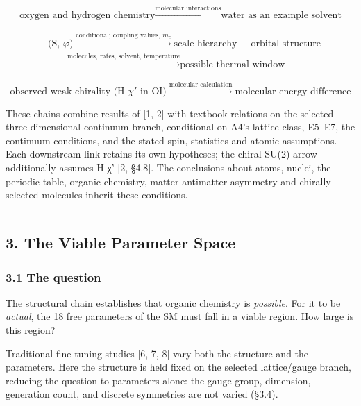 \documentclass[
]{article}
\begin{document}
\[\text{oxygen and hydrogen chemistry} \xrightarrow{\text{molecular interactions}} \text{water as an example solvent}\]

\[\begin{aligned}
&\text{(S, } \varphi\text{)} \xrightarrow{\text{conditional; coupling values, } m_e} \text{scale hierarchy + orbital structure}\\
&\qquad \xrightarrow{\text{molecules, rates, solvent, temperature}} \text{possible thermal window}
\end{aligned}\]

\[\text{observed weak chirality (H-}\chi'\text{ in OI)} \xrightarrow{\text{molecular calculation}} \text{molecular energy difference}\]

These chains combine results of {[}1, 2{]} with textbook relations on
the selected three-dimensional continuum branch, conditional on A4's
lattice class, E5--E7, the continuum conditions, and the stated spin,
statistics and atomic assumptions. Each downstream link retains its own
hypotheses; the chiral-SU(2) arrow additionally assumes H-χ' {[}2,
§4.8{]}. The conclusions about atoms, nuclei, the periodic table,
organic chemistry, matter-antimatter asymmetry and chirally selected
molecules inherit these conditions.

\begin{center}\rule{0.5\linewidth}{0.5pt}\end{center}

\hypertarget{the-viable-parameter-space}{%
\subsection{3. The Viable Parameter
Space}\label{the-viable-parameter-space}}

\hypertarget{the-question}{%
\subsubsection{3.1 The question}\label{the-question}}

The structural chain establishes that organic chemistry is
\emph{possible}. For it to be \emph{actual}, the 18 free parameters of
the SM must fall in a viable region. How large is this region?

Traditional fine-tuning studies {[}6, 7, 8{]} vary both the structure
and the parameters. Here the structure is held fixed on the selected
lattice/gauge branch, reducing the question to parameters alone: the
gauge group, dimension, generation count, and discrete symmetries are
not varied (§3.4).
\end{document}
